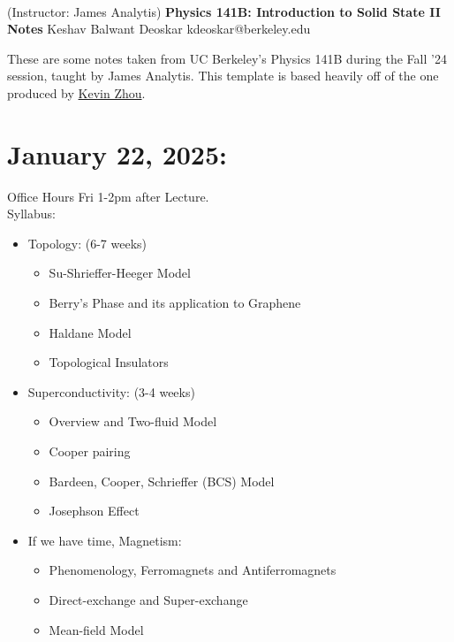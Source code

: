 \documentclass[11pt]{article}
\begin{document}
\thispagestyle{empty}
\bigskip \
\vspace{0.1cm}

\begin{center}
{\fontsize{22}{22} \selectfont (Instructor: James Analytis)}
\vskip 16pt
{\fontsize{36}{36} \selectfont \bf \sffamily Physics 141B: Introduction to Solid State II Notes}
\vskip 24pt
{\fontsize{18}{18} \selectfont \rmfamily Keshav Balwant Deoskar} 
\vskip 6pt
{\fontsize{14}{14} \selectfont \ttfamily kdeoskar@berkeley.edu} 
\vskip 24pt
\end{center}



These are some notes taken from UC Berkeley's Physics 141B during the Fall '24 session, taught by James Analytis. This template is based heavily off of the one produced by \href{https://knzhou.github.io/}{Kevin Zhou}.

\tableofcontents 


\pagebreak
\section{January 22, 2025:}

Office Hours Fri 1-2pm after Lecture.\\
Syllabus: 
\begin{itemize}
  \item Topology: (6-7 weeks)
  \begin{itemize}
    \item Su-Shrieffer-Heeger Model
    \item Berry's Phase and its application to Graphene
    \item Haldane Model
    \item Topological Insulators
  \end{itemize}

  \item Superconductivity: (3-4 weeks)
  \begin{itemize}
    \item Overview and Two-fluid Model
    \item Cooper pairing
    \item Bardeen, Cooper, Schrieffer (BCS) Model
    \item Josephson Effect
  \end{itemize}

  \item If we have time, Magnetism: 
  \begin{itemize}
    \item Phenomenology, Ferromagnets and Antiferromagnets
    \item Direct-exchange and Super-exchange
    \item Mean-field Model
  \end{itemize}
\end{itemize}
\end{document}

